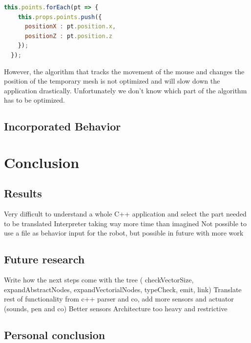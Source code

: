 \documentclass{scrbook}
\begin{document}
\begin{lstlisting}[language=JavaScript, gobble=2, basicstyle=\ttfamily\small]
  this.points.forEach(pt => {                      
    this.props.points.push({
      positionX : pt.position.x,
      positionZ : pt.position.z
    });
  });
\end{lstlisting} 

However, the algorithm that tracks the movement of the mouse and changes the position of the temporary mesh is not optimized and will slow down the application drastically. Unfortunately we don't know which part of the algorithm has to be optimized.

\section{Incorporated Behavior}
\chapter{Conclusion}

\section{Results}

Very difficult to understand a whole C++ application and select the part needed to be translated
Interpreter taking way more time than imagined
Not possible to use a file as behavior input for the robot, but possible in future with more work

\section{Future research \label{future}}

Write how the next steps come with the tree ( checkVectorSize, expandAbstractNodes, expandVectorialNodes, typeCheck, emit, link)
Translate rest of functionality from c++ parser and co, add more sensors and actuator (sounds, pen and co)
Better sensors
Architecture too heavy and restrictive

\section{Personal conclusion}
\end{document}
